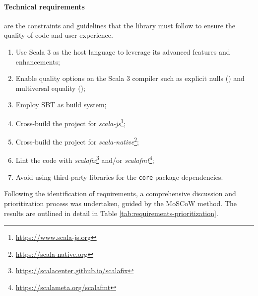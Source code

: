 \paragraph{Technical requirements} are the constraints and guidelines that the library must follow to ensure the quality of code and user experience.
\begin{enumerate}[label=\textbf{T.\arabic*}]
    \item Use Scala 3 as the host language to leverage its advanced features and enhancements;
    \item Enable quality options on the Scala 3 compiler such as explicit nulls () and multiversal equality ();
    \item Employ \ac{SBT} as build system;
    \item Cross-build the project for \textit{scala-js}\footnote{\url{https://www.scala-js.org}};
    \item Cross-build the project for \textit{scala-native}\footnote{\url{https://scala-native.org}};
    \item Lint the code with \textit{scalafix}\footnote{\url{https://scalacenter.github.io/scalafix}} and/or \textit{scalafmt}\footnote{\url{https://scalameta.org/scalafmt}};
    \item Avoid using third-party libraries for the \texttt{core} package dependencies.
\end{enumerate}

Following the identification of requirements, a comprehensive discussion and prioritization process was undertaken, guided by the \ac{MoSCoW} method.
%
The results are outlined in detail in Table \ref{tab:requirements-prioritization}.


